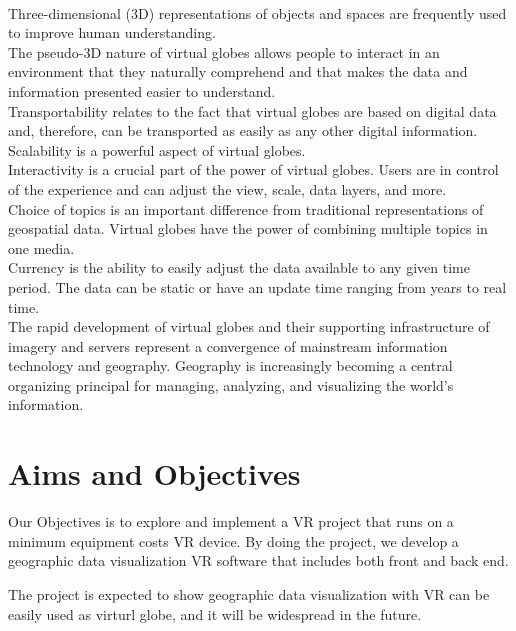 \parencite{tuttle.virtual-globes.2008}\\
Three-dimensional (3D) representations of objects and spaces are frequently used to improve human understanding.\\
The pseudo-3D nature of virtual globes allows people to interact in an environment that they naturally comprehend and that makes the data and information presented easier to understand.\\
Transportability relates to the fact that virtual globes are based on digital data and, therefore, can be transported as easily as any other digital information.\\
Scalability is a powerful aspect of virtual globes.\\
Interactivity is a crucial part of the power of virtual globes. Users are in control of the experience and can adjust the view, scale, data layers, and more.\\
Choice of topics is an important difference from traditional representations of geospatial data. Virtual globes have the power of combining multiple topics in one media.\\
Currency is the ability to easily adjust the data available to any given time period. The data can be static or have an update time ranging from years to real time.\\
The rapid development of virtual globes and their supporting infrastructure of imagery and servers represent a convergence of mainstream information technology and geography. Geography is increasingly becoming a central organizing principal for managing, analyzing, and visualizing the world’s information.\\

\section{Aims and Objectives}

Our Objectives is to explore and implement a VR project that runs on a minimum equipment costs VR device. By doing the project, we develop a geographic data visualization VR software that includes both front and back end.

The project is expected to show geographic data visualization with VR can be easily used as virturl globe, and it will be widespread in the future.

